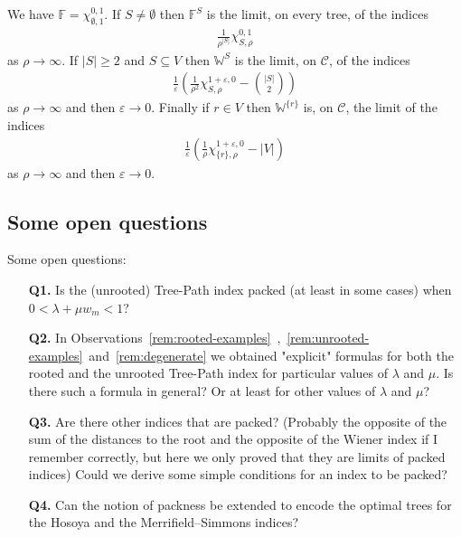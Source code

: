 \documentclass[11 pt]{modarticle}
\newcommand{\wmin}{w_m}
\newcommand{\size}[1]{|#1|}
\newcommand{\tclass}{\mathcal{C}}
\begin{document}
We have $\mathbb{F} = \chi^{0,1}_{\emptyset, 1}$. If $S \neq \emptyset$ then $\mathbb{F}^S$ is the limit, on every tree, of the indices
\begin{eqnarray*}
	\frac{1}{\rho^{\size{S}}} \chi^{0,1}_{S,\rho}
\end{eqnarray*}
as $\rho \rightarrow \infty$. If $\size{S} \geq 2$ and $S \subseteq V$ then $\mathbb{W}^S$ is the limit, on $\tclass$, of the indices
\begin{eqnarray*}
	\frac{1}{\varepsilon}\left(\frac{1}{\rho^2} \chi^{1+\varepsilon,0}_{S,\rho} - {\size{S}\choose{2}} \right)
\end{eqnarray*}
as $\rho \rightarrow \infty$ and then $\varepsilon \rightarrow 0$. Finally if $r \in V$ then $\mathbb{W}^{\{r\}}$ is, on $\tclass$, the limit of the indices
\begin{eqnarray*}
	\frac{1}{\varepsilon}\left(\frac{1}{\rho}\chi^{1+\varepsilon,0}_{\{r\},\rho}-\size{V}\right)
\end{eqnarray*}
as $\rho \rightarrow \infty$ and then $\varepsilon \rightarrow 0$.

\subsection{Some open questions}

Some open questions:
\begin{itemize}
\item[\textbf{Q1.}] Is the (unrooted) Tree-Path index packed (at least in some cases) when $0 < \lambda + \mu \wmin < 1$?
\item[\textbf{Q2.}] In Observations~\ref{rem:rooted-examples}~,~\ref{rem:unrooted-examples}~and~\ref{rem:degenerate} we obtained "explicit" formulas for both the rooted and the unrooted Tree-Path index for particular values of $\lambda$ and $\mu$. Is there such a formula in general? Or at least for other values of $\lambda$ and $\mu$?
\item[\textbf{Q3.}] Are there other indices that are packed? (Probably the opposite of the sum of the distances to the root and the opposite of the Wiener index if I remember correctly, but here we only proved that they are limits of packed indices) Could we derive some simple conditions for an index to be packed?
\item[\textbf{Q4.}] Can the notion of packness be extended to encode the optimal trees for the Hosoya and the Merrifield–Simmons\cite{andriantiana} indices?
\end{itemize}

\pagebreak
{}





\pagebreak
\appendix
\end{document}
